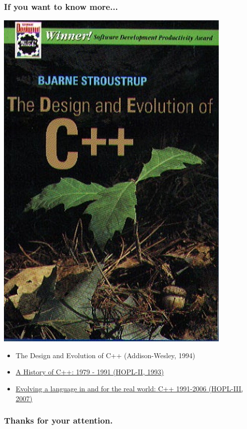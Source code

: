 \documentclass[aspectratio=43]{beamer}
\begin{document}
\begin{frame}
  \frametitle{If you want to know more...}

  \begin{center}
  \includegraphics[height=.45\textheight]{resources/de_cpp.jpg}
  \end{center}
  
  \begin{itemize}
    \item The Design and Evolution of C++ (Addison-Wesley, 1994)
    \item \href{http://www.stroustrup.com/hopl2.pdf}{A History of C++: 1979 - 1991 (HOPL-II, 1993)}
    \item \href{http://www.stroustrup.com/hopl-almost-final.pdf}{Evolving a language in and for the real world: C++ 1991-2006 (HOPL-III, 2007)}
  \end{itemize}


\end{frame}

\begin{frame}
  \frametitle{Thanks for your attention.}
\end{frame}
\end{document}
